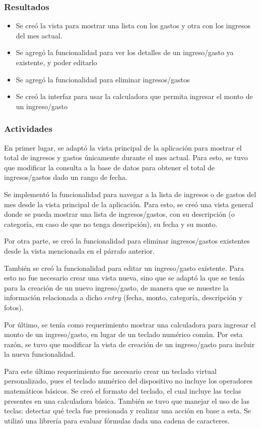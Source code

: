 \subsubsection{Resultados}
\begin{itemize}
\item Se creó la vista para mostrar una lista con los gastos y otra con los ingresos del mes actual.
\item Se agregó la funcionalidad para ver los detalles de un ingreso/gasto ya existente, y poder editarlo
\item Se agregó la funcionalidad para eliminar ingresos/gastos
\item Se creó la interfaz para usar la calculadora que permita ingresar el monto de un ingreso/gasto
\end{itemize}

\subsubsection{Actividades}
En primer lugar, se adaptó la vista principal de la aplicación para mostrar el total de ingresos y gastos únicamente durante el mes actual. Para esto, se tuvo que modificar la consulta a la base de datos para obtener el total de ingresos/gastos dado un rango de fecha.

Se implementó la funcionalidad para navegar a la lista de ingresos o de gastos del mes desde la vista principal de la aplicación. Para esto, se creó una vista general donde se pueda mostrar una lista de ingresos/gastos, con su descripción (o categoría, en caso de que no tenga descripción), su fecha y su monto.

Por otra parte, se creó la funcionalidad para eliminar ingresos/gastos existentes desde la vista mencionada en el párrafo anterior.

También se creó la funcionalidad para editar un ingreso/gasto existente. Para esto no fue necesario crear una vista nueva, sino que se adaptó la que se tenía para la creación de un nuevo ingreso/gasto, de manera que se muestre la información relacionada a dicho $entry$ (fecha, monto, categoría, descripción y fotos).

Por último, se tenía como requerimiento mostrar una calculadora para ingresar el monto de un ingreso/gasto, en lugar de un teclado numérico común. Por esta razón, se tuvo que modificar la vista de creación de un ingreso/gasto para incluir la nueva funcionalidad. 

Para este último requerimiento fue necesario crear un teclado virtual personalizado, pues el teclado numérico del dispositivo no incluye los operadores matemáticos básicos. Se creó el formato del teclado, el cual incluye las teclas presentes en una calculadora básica. También se tuvo que manejar el uso de las teclas: detectar qué tecla fue presionada y realizar una acción en base a esta. Se utilizó una librería para evaluar fórmulas dada una cadena de caracteres.

